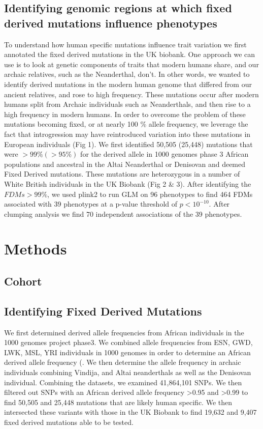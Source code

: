 \subsection{Identifying genomic regions at which fixed derived mutations influence phenotypes}
To understand how human specific mutations influence trait variation we first annotated the fixed derived mutations in the UK biobank. One approach we can use is to look at genetic components of traits that modern humans share, and our archaic relatives, such as the Neanderthal, don’t. In other words, we wanted to identify derived mutations in the modern human genome that differed from our ancient relatives, and rose to high frequency. These mutations occur after modern humans split from Archaic individuals such as Neanderthals, and then rise to a high frequency in modern humans. In order to overcome the problem of these mutations becoming fixed, or at nearly 100 \% allele frequency, we leverage the fact that introgression may have reintroduced variation into these mutations in European individuals (Fig 1). We first identified 50,505 (25,448) mutations that were $>99\% (>95\%)$ for the derived allele in 1000 genomes phase 3 African populations and ancestral in the Altai Neanderthal or Denisovan and deemed Fixed Derived mutations. These mutations are heterozygous in a number of White British individuals in the UK Biobank (Fig 2 & 3). After identifying the $FDMs >99\%$, we used plink2 to run GLM on 96 phenotypes to find 464 FDMs associated with 39 phenotypes at a p-value threshold of $p<10^{-10}$. After clumping analysis we find 70 independent associations of the 39 phenotypes.
\section{Methods}
\subsection{Cohort}
\subsection{Identifying Fixed Derived Mutations}
 We first determined derived allele frequencies from African individuals in the 1000 genomes project phase3. We combined allele frequencies from ESN, GWD, LWK, MSL, YRI individuals in 1000 genomes in order to determine an African derived allele frequency (. We then determine the allele frequency in archaic individuals combining Vindija, and Altai neanderthals as well as the Denisovan individual. Combining the datasets, we examined 41,864,101 SNPs. We then filtered out SNPs with an African derived allele frequency >0.95 and >0.99 to find 50,505 and 25,448 mutations that are likely human specific. We then intersected these variants with those in the UK Biobank to find 19,632 and 9,407 fixed derived mutations able to be tested.
